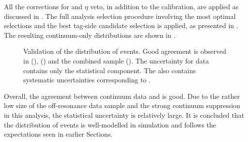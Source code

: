 All the corrections for \piz and $\eta$ veto, in addition to the \FEI calibration, are applied as discussed in .
The full analysis selection procedure involving the most optimal selections and the best tag-side candidate selection is applied, as presented in .
The resulting continuum-only \EB distributions are shown in .
\begin{figure}[hbtp!]
    \caption{\label{fig:offresonance_validation} Validation of the \EB distribution of \epem\ra\qqbar events.
    Good agreement is observed in \feiBp (), \feiBz ()
    and the combined sample ().
    The uncertainty for data contains only the statistical component.
    The \MC also contains systematic uncertainties corresponding to .
    }
\end{figure}

Overall, the agreement between continuum data and \MC is good.
Due to the rather low size of the off-resonance data sample and the strong continuum suppression in this analysis, the statistical uncertainty is relatively large.
It is concluded that the \EB distribution of \epem\ra\qqbar events is well-modelled in simulation and follows the expectations seen in earlier Sections.

